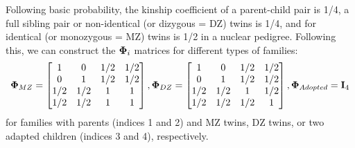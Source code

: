 Following basic probability, the kinship coefficient of a parent-child pair is 1/4, a full sibling pair or non-identical (or dizygous = DZ) twins is 1/4, and for identical (or monozygous = MZ) twins is 1/2 in a nuclear pedigree. Following this, we can construct the ${\boldsymbol{\Phi}}_i$ matrices for different types of families:
%
\begin{align*}
{\boldsymbol{\Phi}}_{MZ} = \begin{bmatrix}
1 & 0 & 1/2 & 1/2 \\
0 & 1 & 1/2 & 1/2 \\
1/2 & 1/2 & 1 & 1\\
1/2 & 1/2 & 1 & 1
\end{bmatrix},
{\boldsymbol{\Phi}}_{DZ} = \begin{bmatrix}
1 & 0 & 1/2 & 1/2 \\
0 & 1 & 1/2 & 1/2 \\
1/2 & 1/2 & 1 & 1/2\\
1/2 & 1/2 & 1/2 & 1
\end{bmatrix},
{\boldsymbol{\Phi}}_{Adopted} = {\mathbf{I}}_4
\end{align*}
%
for families with parents (indices 1 and 2) and MZ twins, DZ twins, or two adapted children (indices 3 and 4), respectively.
